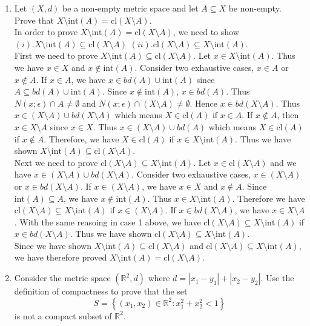 \documentclass{article}
\newcommand{\cl}{\text{cl}}
\newcommand{\intt}{\text{int}}
\begin{document}
\begin{enumerate}
\item Let $(X,d)$ be a non-empty metric space and let $A \subseteq X$ be non-empty. Prove that  $X \setminus \intt(A) = \cl(X\setminus A)$.\\

In order to prove $X \setminus \intt(A) = \cl(X \setminus A)$, we need to show $(i). X \setminus \intt(A) \subseteq \cl(X  \setminus A)$ $(ii). \cl(X \setminus A) \subseteq X \setminus \intt(A)$.\\

First we need to prove $X \setminus \intt(A) \subseteq \cl(X  \setminus A)$. Let $x \in  X \setminus \intt(A)$. Thus we have $x \in X$ and $x \notin \intt(A)$. Consider two exhaustive cases, $x \in A$ or $x \notin A$. If $x \in A$, we have $x \in bd(A) \cup \intt(A)$ since $A \subseteq bd(A) \cup \intt(A)$. Since $x \notin \intt(A)$, $x \in  bd(A)$. Thus $N(x;\epsilon) \cap A \neq  \emptyset$ and $N(x;\epsilon) \cap (X \setminus A) \neq  \emptyset$. Hence $x \in bd(X \setminus A)$. Thus $x \in (X \setminus A) \cup bd(X \setminus A)$ which means $X \in \cl(A)$ if $x \in A$. If $x \notin A$, then $x \in X \setminus A$ since $x \in X$. Thus $x \in (X \setminus A) \cup bd(A)$ which means $X \in \cl(A)$ if $x \notin A$. Therefore, we have $X \in \cl(A)$ if $x \in  X \setminus \intt(A)$. Thus we have shown $X \setminus \intt(A) \subseteq \cl(X  \setminus A)$.\\

Next we need to prove $\cl(X \setminus A) \subseteq X \setminus \intt(A)$. Let $x \in \cl(X \setminus A)$ and we have $x \in (X \setminus A) \cup bd(X \setminus A)$. Consider two exhaustive cases, $x \in (X \setminus A)$ or $x \in bd(X \setminus A)$. If $x \in (X \setminus A)$, we have $x \in X$ and $x \notin A$. Since $\intt(A) \subseteq A$, we have $x \notin \intt(A)$. Thus $x \in X \setminus \intt(A)$. Therefore we have $\cl(X \setminus A) \subseteq X \setminus \intt(A)$ if $x \in (X \setminus A)$. If $x \in bd(X \setminus A)$, we have $x \in X \setminus A$. With the same reasoing in case 1 above, we have $\cl(X \setminus A) \subseteq X \setminus \intt(A)$ if $x \in bd(X \setminus A)$. Thus we have shown $\cl(X \setminus A) \subseteq X \setminus \intt(A)$.\\

Since we have shown $X \setminus \intt(A) \subseteq \cl(X  \setminus A)$ and $\cl(X \setminus A) \subseteq X \setminus \intt(A)$, we have therefore proved $X \setminus \intt(A) = \cl(X \setminus A)$.


\item Consider the metric space $(\mathbb{R}^2,d)$ where $d =  |x_1 -y_1| + |x_2 -y_2|$.  Use the definition of compactness to prove that the set 
$$S = \left\{ (x_1,x_2) \in \mathbb{R}^2: x_1^2+x_2^2 < 1 \right\} $$
is not a compact subset    of $\mathbb{R}^2$.\\\\


\end{enumerate}
\end{document}
